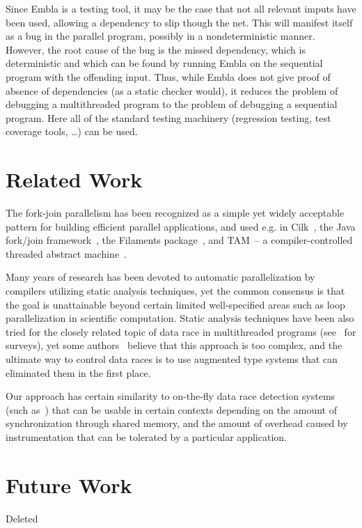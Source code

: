 \documentclass{acm_proc_article-sp}
\begin{document}
Since Embla is a testing tool, it may be the case that not
all relevant imputs have been used, allowing a dependency to slip
though the net. This will manifest itself as a bug in the parallel
program, possibly in a nondeterministic manner. However, the root
cause of the bug is the missed dependency, which is deterministic and
which can be found by running Embla on the sequential program 
with the offending input. Thus,
while Embla does not give proof of absence of dependencies (as a
static checker would), it reduces the problem of debugging a
multithreaded program to the problem of debugging a sequential
program. Here all of the standard testing machinery (regression 
testing, test coverage tools, \ldots) can be used.

\section{Related Work}

The fork-join parallelism has been recognized as a simple yet widely
acceptable pattern for building efficient parallel applications, and used e.g. in
Cilk~\cite{BJKLR96}, the Java fork/join framework~\cite{Lea00}, the
Filaments package~\cite{LF00}, and {TAM}~-- a compiler-controlled
threaded abstract machine~\cite{CGSE93,GSC95}. 

Many years of research has been devoted to automatic parallelization
by compilers utilizing static analysis techniques, yet the common
consensus is that the goal is unattainable beyond certain limited
well-specified areas such as loop parallelization in scientific
computation. Static analysis techniques have been also tried for the
closely related topic of data race in multithreaded programs
(see~\cite{Rinard01,NAW06} for surveys), yet some
authors~\cite{Rinard01} believe that this approach is too complex, and
the ultimate way to control data races is to use augmented type systems
that can eliminated them in the first place.

Our approach has certain similarity to on-the-fly data race detection
systems (such as~\cite{MellorCrummey91,SBNSA97,HRY02}) that can be
usable in certain contexts depending on the amount of synchronization
through shared memory, and the amount of overhead caused by instrumentation that
can be tolerated by a particular application.

\section{Future Work}

Deleted



\end{document}
